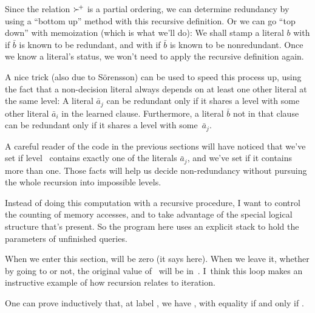 Since the relation $\mathrel{{\succ}\!^+}$ is a partial ordering, we can determine
redundancy by using a ``bottom up'' method with this recursive definition.
Or we can go ``top down'' with memoization (which is what we'll do):
We shall stamp a literal $b$ with  if $\bar b$ is
known to
be redundant, and with  if $\bar b$ is known to be
nonredundant.
Once we know a literal's status, we won't need to apply the recursive
definition again.

A nice trick (also due to S\"orensson) can be used to speed this process up,
using the fact that a non-decision literal always depends on at least one
other literal at the same level: A literal $\bar a_j$ can be redundant
only if it shares a level with some other literal $\bar a_i$ in the
learned clause. Furthermore, a literal $\bar b$ not in that clause can be
redundant only if it shares a level with some~$\bar a_j$.

A careful reader of the code in the previous sections will have noticed
that we've set  if level~
contains exactly one
of the literals $\bar a_j$, and we've set 
if it contains more than one. Those facts will help us decide non-redundancy
without pursuing the whole recursion into impossible levels.

\fi

Instead of doing this computation with a recursive procedure, I want
to control the counting of memory accesses, and to take advantage of
the special logical structure that's present. So the program here uses an
explicit stack to hold the parameters of unfinished queries.

When we enter this section,  will be zero (it says here).
When we leave it, whether by going to  or not,
the original value of~ will be in~.
I~think this loop makes an instructive
example of how recursion relates to iteration.

One can prove inductively that, at label , we have
, with equality if and
only if .

